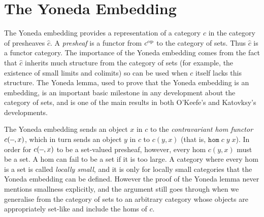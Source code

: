 \documentclass[twoside,titlepage,11pt]{article}
\begin{document}
\section{The Yoneda Embedding}%
\label{Yoneda}
\newcommand{\op}{\ensuremath{\sp{\mathrm{op}}}}
\newcommand{\blank}{\rule[0.5ex]{0.6em}{.4pt}}
The Yoneda embedding provides a representation of a category $c$ in the category of presheaves $\widehat{c}$.
A \emph{presheaf} is a functor from ${c}\op$ to the category of sets.
Thus $\widehat{c}$ is a functor category.
The importance of the Yoneda embedding comes from the fact that $\widehat{c}$ inherits much structure from the category of sets (for example, the existence of small limits and colimits) so can be used when $c$ itself lacks this structure.
The Yoneda lemma, used to prove that the Yoneda embedding is an embedding, is an important basic milestone in any development about the category of sets, and is one of the main results in both O'Keefe's and Katovksy's developments.

The Yoneda embedding sends an object $x$ in $c$ to the \emph{contravariant hom functor} $c(\blank,x)$, which in turn sends an object $y$ in $c$ to $c(y,x)$ (that is, $\mathtt{hom}\;c\;y\;x$).
In order for $c(\blank,x)$ to be a set-valued presheaf, however, every hom $c(y,x)$ must be a set.
A hom can fail to be a set if it is too large.
A category where every hom is a set is called \emph{locally small}, and it is only for locally small categories that the Yoneda embedding can be defined.
However the proof of the Yoneda lemma never mentions smallness explicitly, and the argument still goes through when we generalise from the category of sets to an arbitrary category whose objects are appropriately set-like and include the homs of $c$.
\end{document}
